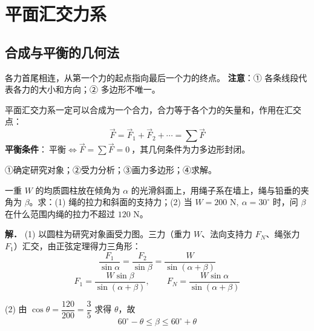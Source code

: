 
\section{平面汇交力系}

\subsection{合成与平衡的几何法}

 各力首尾相连，从第一个力的起点指向最后一个力的终点。
\textbf{注意}：① 各条线段代表各力的大小和方向；② 多边形不唯一。

 平面汇交力系一定可以合成为一个合力，合力等于各个力的矢量和，作用在汇交点：
\begin{equation}
\boxed{\;\vec{F}=\vec{F}_1+\vec{F}_2+\cdots=\sum\vec{F}\;}
\label{eq:2-汇交-合力}
\end{equation}
\textbf{平衡条件}：$\boxed{\ \text{平衡}\iff\vec{F}=\sum\vec{F}=0\ }$，其几何条件为力多边形封闭。

 ①确定研究对象；②受力分析；③画力多边形；④求解。

\begin{example}
一重 $W$ 的均质圆柱放在倾角为 $\alpha$ 的光滑斜面上，用绳子系在墙上，绳与铅垂的夹角为 $\beta$。求：(1) 绳的拉力和斜面的支持力；(2) 当 $W=200\text{ N},\ \alpha=30^\circ$ 时，问 $\beta$ 在什么范围内绳的拉力不超过 $120\text{ N}$。

\textbf{解．}
(1) 以圆柱为研究对象画受力图。三力（重力 $W$、法向支持力 $F_N$、绳张力 $F_1$）汇交，由正弦定理得力三角形：
\begin{equation}
\frac{F_1}{\sin\alpha}=\frac{F_2}{\sin\beta}=\frac{W}{\sin(\alpha+\beta)}
\label{eq:2-例1-正弦}
\end{equation}
\begin{equation}
F_1=\frac{W\sin\beta}{\sin(\alpha+\beta)},\qquad F_N=\frac{W\sin\alpha}{\sin(\alpha+\beta)}
\label{eq:2-例1-拉力}
\end{equation}

(2) 由 $\cos\theta=\dfrac{120}{200}=\dfrac{3}{5}$ 求得 $\theta$，故
\begin{equation}
\boxed{\;60^\circ-\theta\le\beta\le60^\circ+\theta\;}
\label{eq:2-例1-范围}
\end{equation}
\end{example}

